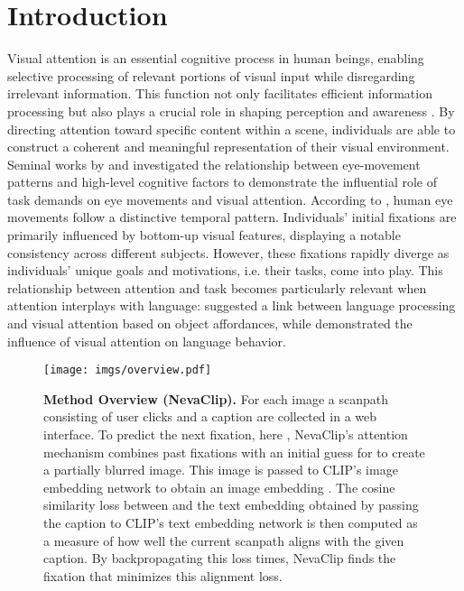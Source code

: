 \documentclass{article}
\begin{document}
\section{Introduction}
Visual attention is an essential cognitive process in human beings, enabling selective processing of relevant portions of visual input while disregarding irrelevant information. This function not only facilitates efficient  information processing but also plays a crucial role in shaping perception and awareness \citep{kietzmann2011overt, macknik2009role}. By directing attention toward specific content within a scene, individuals are able to construct a coherent and meaningful representation of their visual environment. Seminal works by \citet{buswell1935people} and \citet{tatler2010yarbus} investigated the relationship between eye-movement patterns and high-level cognitive factors to demonstrate the influential role of task demands on eye movements and visual attention. According to \citet{tatler2005visual}, human eye movements follow a distinctive temporal pattern. Individuals' initial fixations are primarily influenced by bottom-up visual features, displaying a notable consistency across different subjects. However, these fixations rapidly diverge as individuals' unique goals and motivations, i.e. their tasks, come into play. This relationship between attention and task becomes particularly relevant when attention interplays with language: \citet{altmann2007real} suggested a link between language processing and visual attention based on object affordances, while \citet{mishra2009interaction} demonstrated the influence of visual attention on language behavior.



\begin{figure}[t]
    \centering
    \texttt{[image: imgs/overview.pdf]}
    \caption{\textbf{Method Overview (NevaClip).} For each image  a scanpath  consisting of user clicks and a caption  are collected in a web interface. To predict the next fixation, here , NevaClip's attention mechanism combines past fixations  with an initial guess for  to create a partially blurred image. This image is passed to CLIP's image embedding network  to obtain an image embedding . The cosine similarity loss  between  and the text embedding  obtained by passing the caption to CLIP's text embedding network  is then computed as a measure of how well the current scanpath aligns with the given caption. By backpropagating this loss  times, NevaClip finds the fixation  that minimizes this alignment loss.}
    \label{fig:overview}
\end{figure}
\end{document}
